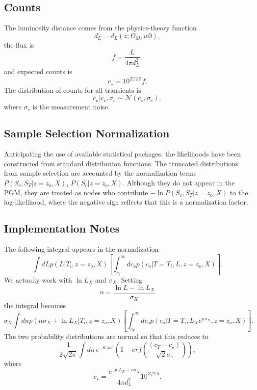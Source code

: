 \documentclass[preprint,3p]{elsarticle}
\begin{document}
\subsection{Counts}
The luminosity distance comes from the physics-theory function
\begin{equation}
d_L = d_L(z; \Omega_M, w0),
\end{equation}
the flux is
\begin{equation}
f = \frac{L}{4\pi d_L^2},
\end{equation}
and expected counts is
\begin{equation}
c_\star = 10^{Z/2.5}f.
\end{equation}
The distribution of counts for all transients is 
\begin{equation}
c_o | c_\star, \sigma_c \sim \mathcal{N}(c_\star, \sigma_c),
\end{equation}
where $\sigma_c$ is the measurement noise.

\subsection{Sample Selection Normalization}
Anticipating the use of available statistical packages, the likelihoods have been constructed
from standard distribution functions.  The truncated distributions from sample selection
are accounted by the normalization 
terms $P(S_c, S_T| z=z_o, X)$, $P(S_c| z=z_o, X)$.  Although they do not appear
in the PGM, they are treated as nodes who contribute 
$-\ln{P(S_c, S_T| z=z_o, X)}$ to the log-likelihood, where the negative sign reflects that this is a normalization
factor.

\subsection{Implementation Notes}
The following integral appears in the normalization
\begin{equation}
\int dL p(L|T_i, z=z_o, X)  \left[\int_{c_T}^{\infty} dc_o  p(c_o | T=T_i, L, z=z_o, X)\right].
\end{equation}
We actually work with $\ln{L_X}$ and $\sigma_X$.  Setting
\begin{equation}
n=\frac{\ln{L}-\ln{L_X}}{\sigma_X}
\end{equation}
the integral becomes
 \begin{equation}
\sigma_X \int dn p(n\sigma_X + \ln{L_X} |T_i, z=z_o, X)  \left[\int_{c_T}^{\infty} dc_o  p(c_o | T=T_i, L_Xe^{n\sigma_X}, z=z_o, X)\right].
\end{equation}
The two probability distributions are normal so that this reduces to
 \begin{equation}
\frac{1}{2\sqrt{2\pi}} \int dn\, e^{-0.5n^2} \left(1-erf\left(\frac{(c_T - c_\star)}{\sqrt{2}\sigma_c}\right)\right),
\end{equation}
where
\begin{equation}
c_\star = \frac{e^{\ln{L_X}+n\sigma_X}}{4\pi d_L^2}10^{Z/2.5}.
\end{equation}
\end{document}
